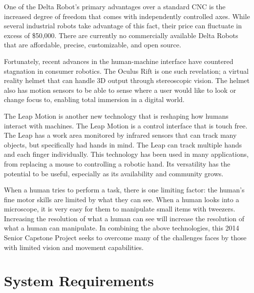\documentclass[11pt]{report}
\begin{document}
One of the Delta Robot's primary advantages over a standard CNC is the increased degree of freedom that comes with independently controlled axes.
While several industrial robots take advantage of this fact, their price can fluctuate in excess of \$50,000.
There are currently no commercially available Delta Robots that are affordable, precise, customizable, and open source.

Fortunately, recent advances in the human-machine interface have countered stagnation in consumer robotics.
The Oculus Rift is one such revelation; a virtual reality helmet that can handle 3D output through stereoscopic vision.
The helmet also has motion sensors to be able to sense where a user would like to look or change focus to, enabling total immersion in a digital world.

The Leap Motion is another new technology that is reshaping how humans interact with machines.
The Leap Motion is a control interface that is touch free.
The Leap has a work area monitored by infrared sensors that can track many objects, but specifically had hands in mind.
The Leap can track multiple hands and each finger individually.
This technology has been used in many applications, from replacing a mouse to controlling a robotic hand.
Its versatility has the potential to be useful, especially as its availability and community grows.

When a human tries to perform a task, there is one limiting factor: the human's fine motor skills are limited by what they can see.
When a human looks into a microscope, it is very easy for them to manipulate small items with tweezers.
Increasing the resolution of what a human can see will increase the resolution of what a human can manipulate.
In combining the above technologies, this 2014 Senior Capstone Project seeks to overcome many of the challenges faces by those with limited vision and movement capabilities.

\section{System Requirements}
\end{document}

